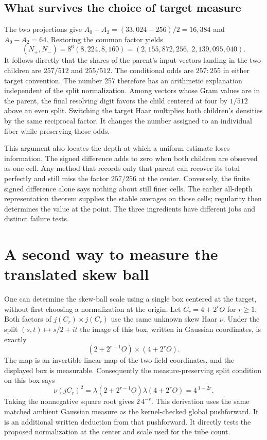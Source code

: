 \documentclass[12pt,letterpaper]{article}
\begin{document}
\subsection{What survives the choice of target measure}
The two projections give $A_0+A_2=(33{,}024-256)/2=16{,}384$ and $A_0-A_2=64$. Restoring the common factor yields
\[
 (N_+,N_-)=8^6(8{,}224,8{,}160)
           =(2{,}155{,}872{,}256,\ 2{,}139{,}095{,}040).
\]
It follows directly that the shares of the parent's input vectors landing in the two children are $257/512$ and $255/512$. The conditional odds are $257:255$ in either target convention. The number 257 therefore has an arithmetic explanation independent of the split normalization. Among vectors whose Gram values are in the parent, the final resolving digit favors the child centered at four by $1/512$ above an even split. Switching the target Haar multiplies both children's densities by the same reciprocal factor. It changes the number assigned to an individual fiber while preserving those odds.

This argument also locates the depth at which a uniform estimate loses information. The signed difference adds to zero when both children are observed as one cell. Any method that records only that parent can recover its total perfectly and still miss the factor $257/256$ at the center. Conversely, the finite signed difference alone says nothing about still finer cells. The earlier all-depth representation theorem supplies the stable averages on those cells; regularity then determines the value at the point. The three ingredients have different jobs and distinct failure tests.

\section{A second way to measure the translated skew ball}
One can determine the skew-ball scale using a single box centered at the target, without first choosing a normalization at the origin. Let $C_r=4+2^rO$ for $r\geq1$. Both factors of $j(C_r)\times j(C_r)$ use the same unknown skew Haar $\nu$. Under the split $(s,t)\mapsto s/2+it$ the image of this box, written in Gaussian coordinates, is exactly
\[
    (2+2^{r-1}O)\times(4+2^rO).
\]
The map is an invertible linear map of the two field coordinates, and the displayed box is measurable. Consequently the measure-preserving split condition on this box says
\[
    \nu(jC_r)^2
    =\lambda(2+2^{r-1}O)\lambda(4+2^rO)
    =4^{\,1-2r}.
\]
Taking the nonnegative square root gives $2\,4^{-r}$. This derivation uses the same matched ambient Gaussian measure as the kernel-checked global pushforward. It is an additional written deduction from that pushforward. It directly tests the proposed normalization at the center and scale used for the tube count.
\end{document}
